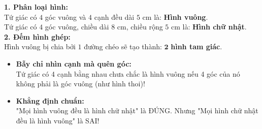 \documentclass[12pt,a4paper]{article}
\begin{document}
\vspace{-2.5mm}
\noindent
\begin{minipage}[t]{0.49\textwidth}\vspace{0pt}
\begin{tcolorbox}[
  enhanced,
  colback=green!4!white,
  colframe=green!60!black,
  arc=2mm, boxrule=0.8pt,
  left=2mm, right=2mm, top=1.8mm, bottom=1.8mm,
  title={\footnotesize\bfseries\color{white}\faCheckCircle\ Ví dụ thực hành chuẩn mực}
]
{\footnotesize
\textbf{1. Phân loại hình:}\\
Tứ giác có $4$ góc vuông và $4$ cạnh đều dài $5\text{ cm}$ là: \textbf{Hình vuông}.\\
Tứ giác có $4$ góc vuông, chiều dài $8\text{ cm}$, chiều rộng $5\text{ cm}$ là: \textbf{Hình chữ nhật}.\\
\textbf{2. Đếm hình ghép:}\\
Hình vuông bị chia bởi $1$ đường chéo sẽ tạo thành: $\mathbf{2}$ \textbf{hình tam giác}.
}
\end{tcolorbox}
\end{minipage}
\hfill
\begin{minipage}[t]{0.49\textwidth}\vspace{0pt}
\begin{tcolorbox}[
  enhanced,
  colback=red!4!white,
  colframe=red!70!black,
  arc=2mm, boxrule=0.8pt,
  left=2mm, right=2mm, top=1.8mm, bottom=1.8mm,
  title={\footnotesize\bfseries\color{white}\faExclamationTriangle\ Mẹo tránh bẫy trắc nghiệm}
]
{\footnotesize
\begin{itemize}\setlength{\itemsep}{1.5pt}\setlength{\leftskip}{-2.5mm}
  \item \textbf{Bẫy chỉ nhìn cạnh mà quên góc:}\\
  Tứ giác có 4 cạnh bằng nhau chưa chắc là hình vuông nếu 4 góc của nó không phải là góc vuông (như hình thoi)!
  \item \textbf{Khẳng định chuẩn:}\\
  "Mọi hình vuông đều là hình chữ nhật" là ĐÚNG. Nhưng "Mọi hình chữ nhật đều là hình vuông" là SAI!
\end{itemize}
}
\end{tcolorbox}
\end{minipage}
\end{document}
